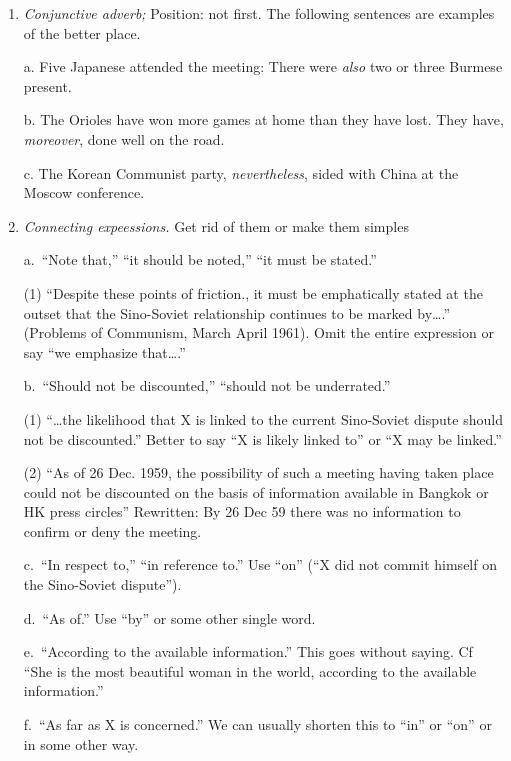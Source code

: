 \documentclass[
    oneside,
    11pt,
]{memoir}
\begin{document}
\begin{enumerate} 
  
\item \emph{Conjunctive adverb;} Position: not first. The following sentences are examples of the better place.

a. Five Japanese attended the meeting: There were \emph{also} two or three Burmese present.

b. The Orioles have won more games at home than they have lost. They have, \emph{moreover}, done well on the road.

c. The Korean Communist party, \emph{nevertheless}, sided with China at the Moscow conference. 

\item \emph{Connecting expeessions.} Get rid of them or make them simples 
  
  a.\ \enquote{Note that,} \enquote{it should be noted,} \enquote{it must be stated.}

  (1) \enquote{Despite these points of friction., it must be emphatically stated at the outset that the Sino-Soviet relationship continues to be marked by\dots.} (Problems of Communism, March April 1961). Omit the entire expression or say \enquote{we emphasize that\dots.} 
  
  b.\ \enquote{Should not be discounted,} \enquote{should not be underrated.} 
  
  (1) \enquote{\dots the likelihood that X is linked to the current Sino-Soviet dispute should not be discounted.} Better to say \enquote{X is likely linked to} or \enquote{X may be linked.} 
  
  (2) \enquote{As of 26 Dec. 1959, the possibility of such a meeting having taken place could not be discounted on the basis of information available in Bangkok or HK press circles}  Rewritten: By 26 Dec 59 there was no information to confirm or deny the meeting.
  
  c.\ \enquote{In respect to,} \enquote{in reference to.} Use \enquote{on} (\enquote{X did not commit himself on the Sino-Soviet dispute}).

  d.\ \enquote{As of.} Use \enquote{by} or some other single word.
  
  e.\ \enquote{According to the available information.} This goes without saying. Cf \enquote{She is the most beautiful woman in the world, according to the available information.} 
  
  f.\ \enquote{As far as X is concerned.} We can usually shorten this to \enquote{in} or \enquote{on} or in some other way.
  

\end{enumerate}
\end{document}
